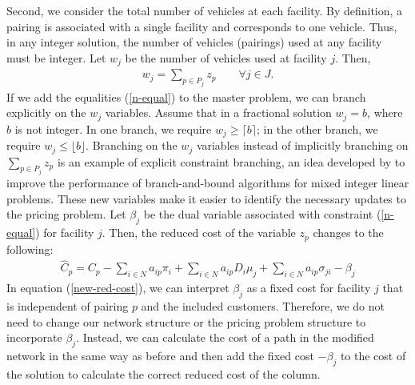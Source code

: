 \documentclass[11pt]{article}
\begin{document}
Second, we consider the total number of vehicles at each facility. By definition, a pairing is associated
with a single facility and corresponds to one vehicle.  Thus, in 
any integer solution, the number of vehicles (pairings) used at any facility must be integer. 
Let $w_j$ be the number of vehicles used at facility $j$.  Then,  
\begin{eqnarray}
  \label{n-equal}
  w_j =\sum_{p \in P_j} z_{p} \qquad \forall j \in J. 
\end{eqnarray}    
If we add the equalities (\ref{n-equal}) to the master problem, we can branch explicitly on
the $w_j$ variables. Assume that in a fractional solution $w_j=b$, where $b$ is not integer.
In one branch, we require $w_j\geq \lceil b \rceil$; in the other
branch, we require  $w_j\leq \lfloor b \rfloor$.
Branching on the $w_j$ variables instead of implicitly  branching
on $\sum_{p \in P_j}z_{p}$ is an example of explicit constraint branching, an idea developed by 
\citet{Appleget} to improve the performance of branch-and-bound algorithms for mixed integer
linear problems. These new variables make it easier to identify the necessary 
updates to the pricing problem. 
Let $\beta_j$ be the dual variable associated with constraint (\ref{n-equal}) for facility $j$.
Then, the reduced cost of the variable $z_{p}$  changes to the following:
\begin{eqnarray}
  \label{new-red-cost}
  \hat{C}_{p}=C_{p}-\sum_{i\in N}a_{ip} \pi_{i}+\sum_{i \in N}a_{ip} D_{i} \mu_{j}+\sum_{i \in N}a_{ip} \sigma_{ji}-\beta_j
\end{eqnarray} 
In equation (\ref{new-red-cost}), we can interpret $\beta_j$ as a fixed cost for facility $j$ that is
independent of pairing $p$ and the included customers.  Therefore, we do not need 
to change our network structure or the pricing problem structure to incorporate $\beta_j$. 
Instead, we can calculate the cost of a path in the modified network in the same way as before and 
then add the fixed cost $-\beta_j$ to the cost of the solution to calculate the correct
reduced cost of the column.     
\end{document}
